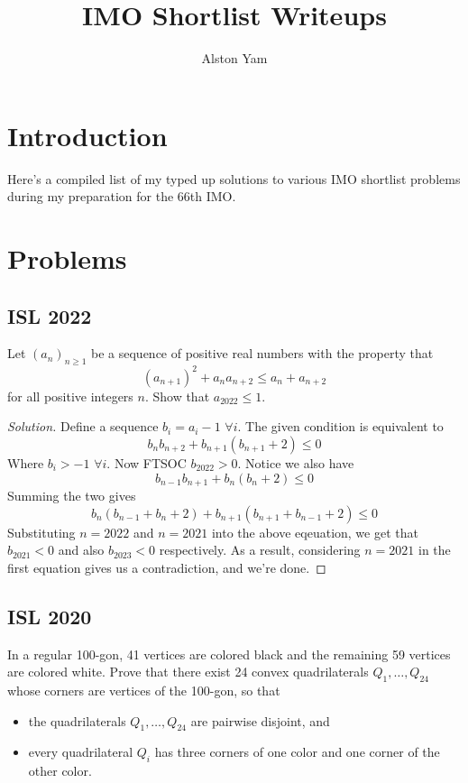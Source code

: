 \documentclass{article}
\title{IMO Shortlist Writeups}
\author{Alston Yam}
\theoremstyle{mytheoremstyle}
\theoremstyle{mytheoremstyle}
\theoremstyle{myproblemstyle}
\begin{document}
    \maketitle
    \section{Introduction}
    Here's a compiled list of my typed up solutions to various IMO shortlist problems during my preparation for the 66th IMO.
    
    \section{Problems}
    \subsection{ISL 2022}

    \begin{problem}[2022 A1]
        Let $(a_n)_{n\geq 1}$ be a sequence of positive real numbers with the property that
            \[ (a_{n+1})^2 + a_na_{n+2} \leq a_n + a_{n+2} \]
        for all positive integers $n$. Show that $a_{2022}\leq 1$.
    \end{problem}

    \begin{proof}[Solution]
        Define a sequence $b_i = a_i - 1$ $\forall i$. The given condition is equivalent to \[b_nb_{n+2} + b_{n+1}(b_{n+1} + 2) \leq 0\]
        Where $b_i > -1$ $\forall i$. Now FTSOC $b_{2022} > 0$. Notice we also have \[b_{n-1}b_{n+1} + b_{n}(b_{n} + 2) \leq 0\]
        Summing the two gives
        \[b_n(b_{n-1} + b_n + 2) + b_{n+1}(b_{n+1} + b_{n-1} + 2)\leq 0\]
        Substituting $n=2022$ and $n=2021$ into the above eqeuation, we get that $b_{2021} < 0$ and also $b_{2023} < 0$ respectively. As a result, considering $n=2021$ in the first equation gives us a contradiction, and we're done.
    \end{proof}

    \subsection{ISL 2020}

    \begin{problem}[2020 C2]
        In a regular 100-gon, 41 vertices are colored black and the remaining 59 vertices are colored white. Prove that there exist 24 convex quadrilaterals $Q_1, \ldots, Q_{24}$ whose corners are vertices of the 100-gon, so that
        \begin{itemize}
        \item the quadrilaterals $Q_1, \ldots, Q_{24}$ are pairwise disjoint, and
        \item every quadrilateral $Q_i$ has three corners of one color and one corner of the other color.
        \end{itemize}
    \end{problem}
\end{document}
